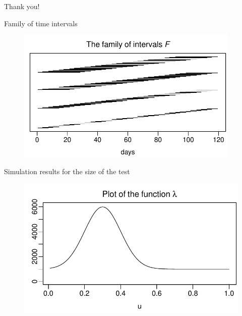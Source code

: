 \documentclass[10pt]{beamer}
\begin{document}
\begin{frame}[standout]
  Thank you!
\end{frame}


\appendix

\begin{frame}{Family of time intervals}
	\begin{figure}
		\includegraphics[width=0.95\textwidth]{plots/all_intervals}
	\end{figure}
\end{frame}

\begin{frame}{Simulation results for the size of the test}
\begin{figure}[t!]
	\includegraphics[height = 0.4\textheight]{plots/lambda_fct}
\end{figure}
\vspace{-2mm}
\scriptsize{\begin{table}[t]
\begin{center}
\caption{Size of the multiscale test}
\label{tab:size_shape}

\end{center}
\end{table}}
\end{frame}
\end{document}
